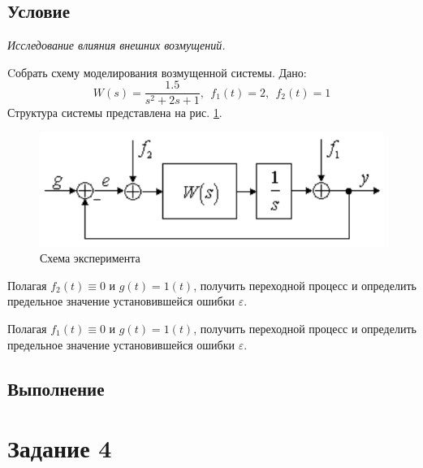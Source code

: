 \documentclass[a4paper, 12pt]{article}
\begin{document}
    \subsection{Условие}
    \textit{Исследование влияния внешних возмущений.}
    \begin{compactitem}
        \item Cобрать схему моделирования возмущенной системы. Дано:
        $$W(s)=\dfrac{1.5}{s^2+2s+1},\ \ f_1(t)=2,\ \ f_2(t)=1$$
        Структура системы представлена на рис. \ref{fig:struct_scheme3}.
        \begin{figure}[H]
            \centering
            \includegraphics[scale=0.75]{struct_scheme3.png}
            \captionsetup{skip=0pt}
            \caption{Схема эксперимента}
            \label{fig:struct_scheme3}
        \end{figure}
        \item Полагая $f_2(t)\equiv0$ и $g(t)=1(t)$, получить переходной процесс и определить
        предельное значение установившейся ошибки $\varepsilon$.
        \item Полагая $f_1(t)\equiv0$ и $g(t)=1(t)$, получить переходной процесс и определить
        предельное значение установившейся ошибки $\varepsilon$.
    \end{compactitem}


    \subsection{Выполнение}


    \section{Задание 4}
\end{document}
